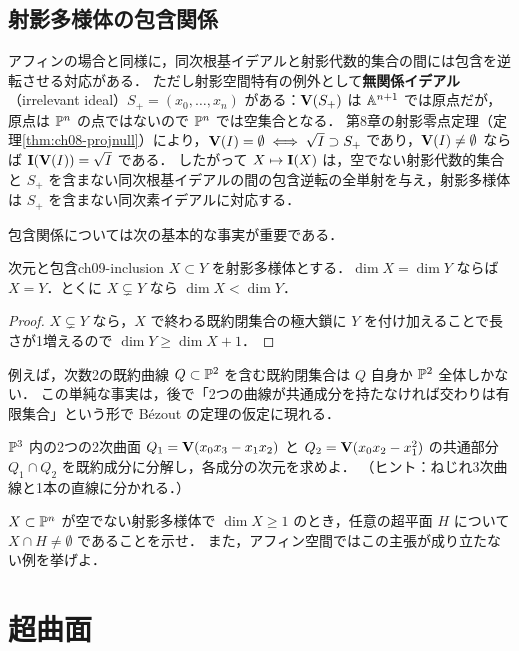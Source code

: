 \subsection{射影多様体の包含関係}

アフィンの場合と同様に，同次根基イデアルと射影代数的集合の間には包含を逆転させる対応がある．
ただし射影空間特有の例外として\textbf{無関係イデアル}（irrelevant ideal）$S_+=(x_0,\dots,x_n)$ がある：$\mathbf{V}(S_+)$ は $\mathbb{A}^{n+1}$ では原点だが，原点は $\mathbb{P}^n$ の点ではないので $\mathbb{P}^n$ では空集合となる．
第8章の射影零点定理（定理\ref{thm:ch08-projnull}）により，$\mathbf{V}(I)=\emptyset\iff\sqrt I\supset S_+$ であり，$\mathbf{V}(I)\neq\emptyset$ ならば $\mathbf{I}(\mathbf{V}(I))=\sqrt I$ である．
したがって $X\mapsto\mathbf{I}(X)$ は，空でない射影代数的集合と $S_+$ を含まない同次根基イデアルの間の包含逆転の全単射を与え，射影多様体は $S_+$ を含まない同次素イデアルに対応する．

包含関係については次の基本的な事実が重要である．

\begin{myprop}{次元と包含}{ch09-inclusion}
$X\subset Y$ を射影多様体とする．$\dim X=\dim Y$ ならば $X=Y$．とくに $X\subsetneq Y$ なら $\dim X<\dim Y$．
\end{myprop}

\begin{proof}
$X\subsetneq Y$ なら，$X$ で終わる既約閉集合の極大鎖に $Y$ を付け加えることで長さが1増えるので $\dim Y\ge\dim X+1$．
\end{proof}

例えば，次数2の既約曲線 $Q\subset\mathbb{P}^2$ を含む既約閉集合は $Q$ 自身か $\mathbb{P}^2$ 全体しかない．
この単純な事実は，後で「2つの曲線が共通成分を持たなければ交わりは有限集合」という形で B\'ezout の定理の仮定に現れる．

$\mathbb{P}^3$ 内の2つの2次曲面 $Q_1=\mathbf{V}(x_0x_3-x_1x_2)$ と $Q_2=\mathbf{V}(x_0x_2-x_1^2)$ の共通部分 $Q_1\cap Q_2$ を既約成分に分解し，各成分の次元を求めよ．
（ヒント：ねじれ3次曲線と1本の直線に分かれる．）

$X\subset\mathbb{P}^n$ が空でない射影多様体で $\dim X\ge1$ のとき，任意の超平面 $H$ について $X\cap H\neq\emptyset$ であることを示せ．
また，アフィン空間ではこの主張が成り立たない例を挙げよ．

\section{超曲面}

